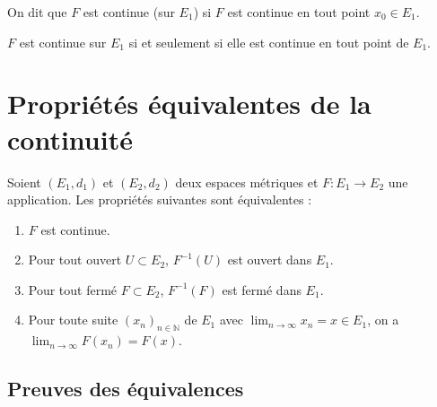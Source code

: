 \documentclass[oneside]{book}
\begin{document}
\begin{definition}
On dit que $F$ est continue (sur $E_1$) si $F$ est continue en tout point $x_0 \in E_1$.
\end{definition}

\begin{proposition}
$F$ est continue sur $E_1$ si et seulement si elle est continue en tout point de $E_1$.
\end{proposition}

\section{Propriétés équivalentes de la continuité}

\begin{proposition}
Soient $(E_1, d_1)$ et $(E_2, d_2)$ deux espaces métriques et $F : E_1 \to E_2$ une application. Les propriétés suivantes sont équivalentes :
\begin{enumerate}
    \item $F$ est continue.
    \item Pour tout ouvert $U \subset E_2$, $F^{-1}(U)$ est ouvert dans $E_1$.
    \item Pour tout fermé $F \subset E_2$, $F^{-1}(F)$ est fermé dans $E_1$.
    \item Pour toute suite $(x_n)_{n \in \mathbb{N}}$ de $E_1$ avec $\lim_{n \to \infty} x_n = x \in E_1$, on a $\lim_{n \to \infty} F(x_n) = F(x)$.
\end{enumerate}
\end{proposition}

\subsection{Preuves des équivalences}
\end{document}

